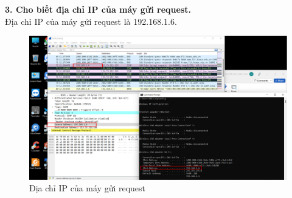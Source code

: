 \textbf{3.	Cho biết địa chỉ IP của máy gửi request.}\\
Địa chỉ IP của máy gửi request là 192.168.1.6.
\begin{figure}[H]
\begin{center}
\includegraphics[scale=.8]{../figures/p3/p3_hostip}
\end{center}
\caption{Địa chỉ IP của máy gửi request}
\end{figure}

